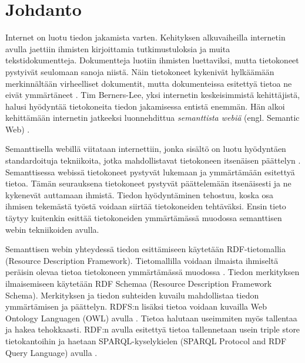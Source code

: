 \documentclass[finnish, 12pt, a4paper, elec, utf8, pdfa, online]{aaltothesis}
\begin{document}
\cleardoublepage


\section{Johdanto}

\thispagestyle{empty}
Internet on luotu tiedon jakamista varten. Kehityksen alkuvaiheilla internetin avulla jaettiin ihmisten kirjoittamia tutkimustuloksia ja muita tekstidokumentteja. Dokumentteja luotiin ihmisten luettaviksi, mutta tietokoneet pystyivät seulomaan sanoja niistä. Näin tietokoneet kykenivät hylkäämään merkinnältään virheelliset dokumentit, mutta dokumenteissa esitettyä tietoa ne eivät ymmärtäneet \cite{WWW}. Tim Berners-Lee, yksi internetin keskeisimmistä kehittäjistä, halusi hyödyntää tietokoneita tiedon jakamisessa entistä enemmän. Hän alkoi kehittämään internetin jatkeeksi luonnehdittua \textit{semanttista webiä} (engl. Semantic Web) \cite{Berners_visio}.

Semanttisella webillä viitataan internettiin, jonka sisältö on luotu hyödyntäen standardoituja tekniikoita, jotka mahdollistavat tietokoneen itsenäisen päättelyn \cite{Berners_visio}. Semanttisessa webissä tietokoneet pystyvät lukemaan ja ymmärtämään esitettyä tietoa. Tämän seurauksena tietokoneet pystyvät päättelemään itsenäisesti ja ne kykenevät auttamaan ihmistä. Tiedon hyödyntäminen tehostuu, koska osa ihmisen tekemästä työstä voidaan siirtää tietokoneiden tehtäväksi. Ensin tieto täytyy kuitenkin esittää tietokoneiden ymmärtämässä muodossa semanttisen webin tekniikoiden avulla.

Semanttisen webin yhteydessä tiedon esittämiseen käytetään RDF-tietomallia (Resource Description Framework). Tietomallilla voidaan ilmaista ihmiseltä peräisin olevaa tietoa tietokoneen ymmärtämässä muodossa \cite{RDF_specification}. Tiedon merkityksen ilmaisemiseen käytetään RDF Schemaa (Resource Description Framework Schema). Merkityksen ja tiedon suhteiden kuvailu mahdollistaa tiedon ymmärtämisen ja päättelyn. RDFS:n lisäksi tietoa voidaan kuvailla Web Ontology Languagen (OWL) avulla \cite{OWL_specification}. Tietoa halutaan useimmiten myös tallentaa ja hakea tehokkaasti. RDF:n avulla esitettyä tietoa tallennetaan usein triple store tietokantoihin ja haetaan SPARQL-kyselykielen (SPARQL Protocol and RDF Query Language) avulla \cite{sparql}.
\end{document}

